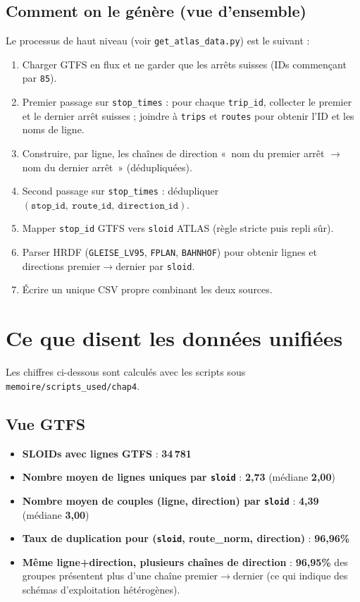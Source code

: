 \subsection{Comment on le génère (vue d'ensemble)}
Le processus de haut niveau (voir \texttt{get\_atlas\_data.py}) est le suivant :
\begin{enumerate}
  \item Charger GTFS en flux et ne garder que les arrêts suisses (IDs commençant par \texttt{85}).
  \item Premier passage sur \texttt{stop\_times} : pour chaque \texttt{trip\_id}, collecter le premier et le dernier arrêt suisses ; joindre à \texttt{trips} et \texttt{routes} pour obtenir l'ID et les noms de ligne.
  \item Construire, par ligne, les chaînes de direction « nom du premier arrêt $\rightarrow$ nom du dernier arrêt » (dédupliquées).
  \item Second passage sur \texttt{stop\_times} : dédupliquer \((\texttt{stop\_id},\ \texttt{route\_id},\ \texttt{direction\_id})\).
  \item Mapper \texttt{stop\_id} GTFS vers \texttt{sloid} ATLAS (règle stricte puis repli sûr).
  \item Parser HRDF (\texttt{GLEISE\_LV95}, \texttt{FPLAN}, \texttt{BAHNHOF}) pour obtenir lignes et directions premier$\rightarrow$dernier par \texttt{sloid}.
  \item Écrire un unique CSV propre combinant les deux sources.
\end{enumerate}

\section{Ce que disent les données unifiées}
Les chiffres ci-dessous sont calculés avec les scripts sous \texttt{memoire/scripts\_used/chap4}.

\subsection*{Vue GTFS}
\begin{itemize}
  \item \textbf{SLOIDs avec lignes GTFS} : \textbf{34\,781}
  \item \textbf{Nombre moyen de lignes uniques par \texttt{sloid}} : \textbf{2,73} (médiane \textbf{2,00})
  \item \textbf{Nombre moyen de couples (ligne, direction) par \texttt{sloid}} : \textbf{4,39} (médiane \textbf{3,00})
  \item \textbf{Taux de duplication pour (\texttt{sloid}, route\_norm, direction)} : \textbf{96,96\%}
  \item \textbf{Même ligne+direction, plusieurs chaînes de direction} : \textbf{96,95\%} des groupes présentent plus d'une chaîne premier$\rightarrow$dernier (ce qui indique des schémas d'exploitation hétérogènes).
\end{itemize}

